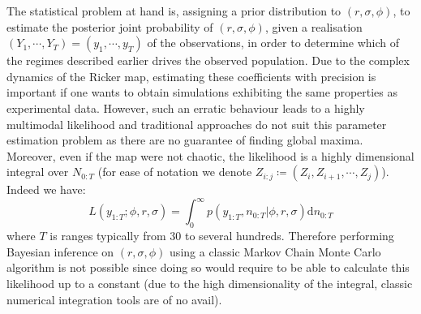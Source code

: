 \documentclass[12pt]{article}
\begin{document}
	The statistical problem at hand is, assigning a  prior distribution to $(r, \sigma, \phi)$, to estimate the posterior joint probability of $(r, \sigma, \phi)$, given a realisation $(Y_1, \cdots, Y_T) = (y_1, \cdots, y_T) $ of the observations, in order to determine which of the regimes described earlier drives the observed population. Due to the complex dynamics of the Ricker map, estimating these coefficients with precision is important if one wants to obtain simulations exhibiting the same properties as experimental data. However, such an erratic behaviour leads to a highly multimodal likelihood and traditional approaches do not suit this parameter estimation problem as there are no guarantee of finding global maxima. \\
	Moreover, even if the map were not chaotic, the likelihood is a highly dimensional integral over $N_{0:T}$ (for ease of notation we denote $Z_{i:j} \coloneqq (Z_i, Z_{i+1}, \cdots, Z_j)$). Indeed we have:
	\begin{equation}
	L(y_{1:T}; \phi, r, \sigma) = \int_{0}^{\infty}p(y_{1:T}, n_{0:T} | \phi, r, \sigma)\mathrm{d}n_{0:T}
	\end{equation}
	where $T$ is ranges typically from 30 to several hundreds. Therefore performing Bayesian inference on  $(r, \sigma, \phi)$ using a classic Markov Chain Monte Carlo algorithm is not possible since doing so would require to be able to calculate this likelihood up to a constant (due to the high dimensionality of the integral, classic numerical integration tools are of no avail).
	
\end{document}
